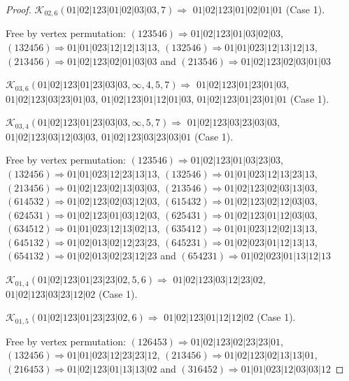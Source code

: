 \documentclass[12pt]{article}
\theoremstyle{plain}
\theoremstyle{definition}
\theoremstyle{remark}
\newcommand{\fancy}[1]{\mathcal{#1}}
\def\K{\fancy{K}}
\begin{document}
\begin{proof}
	$\K_{02,6}(01|02|123|01|02|03|03,7)\Rightarrow $ $01|02|123|01|02|01|01$ (Case 1).
	
	
	
	Free by vertex permutation: $(1 2 3 5 4 6)\Rightarrow 01|02|123|01|03|02|03$, $(1 3 2 4 5 6)\Rightarrow 01|01|023|12|12|13|13$, $(1 3 2 5 4 6)\Rightarrow 01|01|023|12|13|12|13$, $(2 1 3 4 5 6)\Rightarrow 01|02|123|02|01|03|03$ and $(2 1 3 5 4 6)\Rightarrow 01|02|123|02|03|01|03$
	
	
	
	\bigskip
	
	$\K_{03,6}(01|02|123|01|23|03|03,\infty,4, 5, 7)\Rightarrow $ $01|02|123|01|23|01|03$, $01|02|123|03|23|01|03$, $01|02|123|01|12|01|03$, $01|02|123|01|23|01|01$ (Case 1).
	
	$\K_{03,4}(01|02|123|01|23|03|03,\infty,5, 7)\Rightarrow $ $01|02|123|03|23|03|03$, $01|02|123|03|12|03|03$, $01|02|123|03|23|03|01$ (Case 1).
	
	
	
	Free by vertex permutation: $(1 2 3 5 4 6)\Rightarrow 01|02|123|01|03|23|03$, $(1 3 2 4 5 6)\Rightarrow 01|01|023|12|23|13|13$, $(1 3 2 5 4 6)\Rightarrow 01|01|023|12|13|23|13$, $(2 1 3 4 5 6)\Rightarrow 01|02|123|02|13|03|03$, $(2 1 3 5 4 6)\Rightarrow 01|02|123|02|03|13|03$, $(6 1 4 5 3 2)\Rightarrow 01|02|123|02|03|12|03$, $(6 1 5 4 3 2)\Rightarrow 01|02|123|02|12|03|03$, $(6 2 4 5 3 1)\Rightarrow 01|02|123|01|03|12|03$, $(6 2 5 4 3 1)\Rightarrow 01|02|123|01|12|03|03$, $(6 3 4 5 1 2)\Rightarrow 01|01|023|12|13|02|13$, $(6 3 5 4 1 2)\Rightarrow 01|01|023|12|02|13|13$, $(6 4 5 1 3 2)\Rightarrow 01|02|013|02|12|23|23$, $(6 4 5 2 3 1)\Rightarrow 01|02|023|01|12|13|13$, $(6 5 4 1 3 2)\Rightarrow 01|02|013|02|23|12|23$ and $(6 5 4 2 3 1)\Rightarrow 01|02|023|01|13|12|13$
	
	
	
	\bigskip
	
	$\K_{01,4}(01|02|123|01|23|23|02,5, 6)\Rightarrow $ $01|02|123|03|12|23|02$, $01|02|123|03|23|12|02$ (Case 1).
	
	$\K_{01,5}(01|02|123|01|23|23|02,6)\Rightarrow $ $01|02|123|01|12|12|02$ (Case 1).
	
	
	
	Free by vertex permutation: $(1 2 6 4 5 3)\Rightarrow 01|02|123|02|23|23|01$, $(1 3 2 4 5 6)\Rightarrow 01|01|023|12|23|23|12$, $(2 1 3 4 5 6)\Rightarrow 01|02|123|02|13|13|01$, $(2 1 6 4 5 3)\Rightarrow 01|02|123|01|13|13|02$ and $(3 1 6 4 5 2)\Rightarrow 01|01|023|12|03|03|12$
	
	
	

\end{proof}
\end{document}
